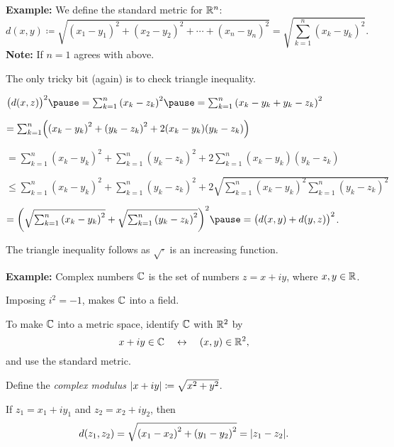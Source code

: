 \documentclass[10pt,aspectratio=149]{beamer}
\begin{document}
\begin{frame}

\textbf{Example:}
We define the
standard metric for ${\mathbb{R}}^n$:
\begin{equation*}
d(x,y) \coloneqq
\sqrt{
{(x_1-y_1)}^2 + 
{(x_2-y_2)}^2 + 
\cdots +
{(x_n-y_n)}^2
} =
\sqrt{
\sum_{k=1}^n
{(x_k-y_k)}^2 
} .
\end{equation*}
\pause
\textbf{Note:} If $n=1$ agrees with above.

\pause
\medskip

The only tricky bit (again) is to check triangle inequality.

\pause
\medskip

$
{\bigl(d(x,z)\bigr)}^2
\pause
=
\sum_{k=1}^n
{(x_k-z_k)}^2 
\pause
=
\sum_{k=1}^n
{(x_k-y_k+y_k-z_k)}^2 
$

\pause
\medskip

\quad
$
=
\sum_{k=1}^n
\Bigl(
{(x_k-y_k)}^2+{(y_k-z_k)}^2 + 2(x_k-y_k)(y_k-z_k)
\Bigr)
$

\pause
\medskip

\quad
$
=
\sum_{k=1}^n
{(x_k-y_k)}^2
+
\sum_{k=1}^n
{(y_k-z_k)}^2 
+
2
\sum_{k=1}^n
(x_k-y_k)(y_k-z_k)
$

\pause
\medskip

\quad
$
\leq
\sum_{k=1}^n
{(x_k-y_k)}^2
+
\sum_{k=1}^n
{(y_k-z_k)}^2 
+
2
\sqrt{
\sum_{k=1}^n
{(x_k-y_k)}^2
\sum_{k=1}^n
{(y_k-z_k)}^2
}
$

\pause
\medskip

\quad
$
=
{\left(
\sqrt{
\sum_{k=1}^n
{(x_k-y_k)}^2
}
+
\sqrt{
\sum_{k=1}^n
{(y_k-z_k)}^2 
}
\right)}^2
\pause
=
{\bigl( d(x,y) + d(y,z) \bigr)}^2$.

\pause
\medskip

The triangle inequality follows as $\sqrt{\cdot}$ is an increasing function.

\end{frame}

\begin{frame}

\textbf{Example:}
Complex numbers ${\mathbb{C}}$ is the set of numbers $z = x+iy$, where $x,y \in {\mathbb{R}}$.

\pause
\medskip

Imposing $i^2 = -1$, makes ${\mathbb{C}}$ into a field.

\pause
\medskip

To make ${\mathbb{C}}$ into a metric space, identify ${\mathbb{C}}$ with ${\mathbb{R}}^2$ by
\[
x+iy \in {\mathbb{C}} \quad \leftrightarrow \quad (x,y) \in {\mathbb{R}}^2 ,
\]
and use the standard metric.

\pause
\medskip

Define the \emph{complex modulus} $\lvert {x+iy} \rvert \coloneqq \sqrt{x^2+y^2}$.

\pause
\medskip

If $z_1 = x_1 + iy_1$ and $z_2 = x_2 + iy_2$, then
\[
d(z_1,z_2) = \sqrt{{(x_1-x_2)}^2+ {(y_1-y_2)}^2} = \lvert {z_1-z_2} \rvert.
\]
\end{frame}
\end{document}
